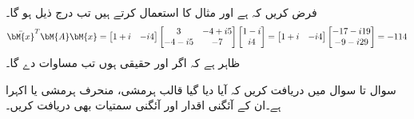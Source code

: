 \quad {}\\
فرض کریں کہ  ہے اور مثال  کا  استعمال کرتے ہیں تب درج ذیل ہو گا۔
\begin{align*}
\bar{\bM{x}}^T\bM{A}\bM{x}=\begin{bmatrix} 1+i&-i4 \end{bmatrix}\begin{bmatrix} 3&-4+i5\\-4-i5&-7 \end{bmatrix}\begin{bmatrix} 
1-i\\i4 \end{bmatrix}=\begin{bmatrix} 1+i&-i4 \end{bmatrix}\begin{bmatrix} -17-i19\\-9-i29 \end{bmatrix}=-114
\end{align*}
ظاہر ہے کہ اگر   اور  حقیقی ہوں تب مساوات   دے گا۔


سوال  تا سوال  میں دریافت کریں کہ آیا دیا گیا قالب ہرمشی، منحرف ہرمشی یا اکہرا ہے۔ان کے آئگنی اقدار اور آئگنی سمتیات بھی دریافت کریں۔ 

